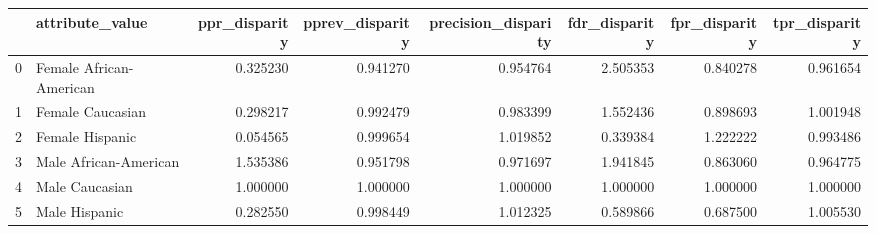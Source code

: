 \begin{tabular}{llrrrrrr}
\toprule
{} &          attribute\_value &  ppr\_disparity &  pprev\_disparity &  precision\_disparity &  fdr\_disparity &  fpr\_disparity &  tpr\_disparity \\
\midrule
0 &  Female African-American &       0.325230 &         0.941270 &             0.954764 &       2.505353 &       0.840278 &       0.961654 \\
1 &         Female Caucasian &       0.298217 &         0.992479 &             0.983399 &       1.552436 &       0.898693 &       1.001948 \\
2 &          Female Hispanic &       0.054565 &         0.999654 &             1.019852 &       0.339384 &       1.222222 &       0.993486 \\
3 &    Male African-American &       1.535386 &         0.951798 &             0.971697 &       1.941845 &       0.863060 &       0.964775 \\
4 &           Male Caucasian &       1.000000 &         1.000000 &             1.000000 &       1.000000 &       1.000000 &       1.000000 \\
5 &            Male Hispanic &       0.282550 &         0.998449 &             1.012325 &       0.589866 &       0.687500 &       1.005530 \\
\bottomrule
\end{tabular}
